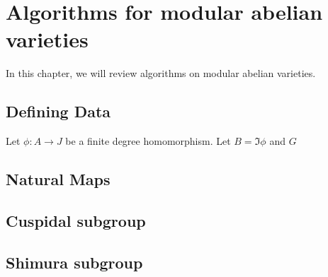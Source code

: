 \documentclass[11pt, proquest]{uwthesis}
\begin{document}
\chapter{Algorithms for modular abelian varieties}%
\label{chap:algorithms}


In this chapter, we will review algorithms on modular abelian varieties.

\section{Defining Data}

Let $\phi:A\to J$ be a finite degree homomorphism. Let $B=\Im \phi$ and $G$

\section{Natural Maps}

\section{Cuspidal subgroup}

\section{Shimura subgroup}
\end{document}

